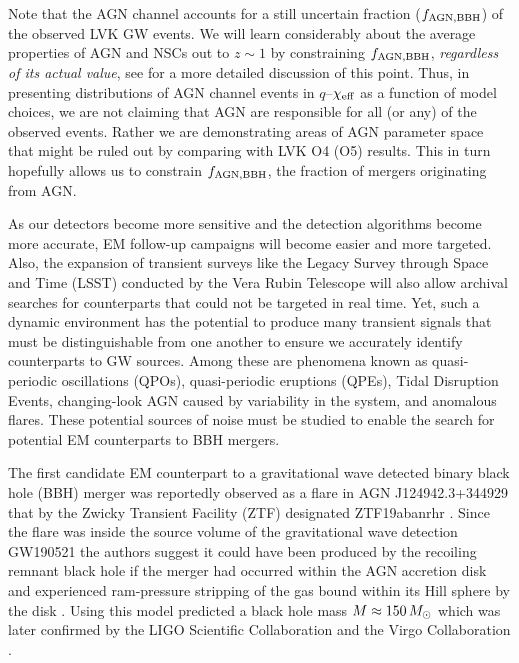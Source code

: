 Note that the AGN channel accounts for a still uncertain fraction ($f_{\rm AGN,BBH}$) of the observed LVK GW events.
We will learn considerably about the average properties of AGN and NSCs out to $z \sim 1$ by constraining $f_{\rm AGN, BBH}$, \emph{regardless of its actual value}, see \citet{FordMcKernan25} for a more detailed discussion of this point.
Thus, in presenting distributions of AGN channel events in $q$--$\chi_{\rm eff}$ as a function of model choices, we are not claiming that AGN are responsible for all (or any) of the observed events.
Rather we are demonstrating areas of AGN parameter space that might be ruled out by comparing with LVK O4 (O5) results.
This in turn hopefully allows us to constrain $f_{\rm AGN,BBH}$, the fraction of mergers originating from AGN.

As our detectors become more sensitive and the detection algorithms become more accurate, EM follow-up campaigns will become easier and more targeted.
Also, the expansion of transient surveys like the Legacy Survey through Space and Time (LSST) conducted by the Vera Rubin Telescope will also allow archival searches for counterparts that could not be targeted in real time.
Yet, such a dynamic environment has the potential to produce many transient signals that must be distinguishable from one another to ensure we accurately identify counterparts to GW sources.
Among these are phenomena known as quasi-periodic oscillations (QPOs), quasi-periodic eruptions (QPEs), Tidal Disruption Events, changing-look AGN caused by variability in the system, and anomalous flares.
These potential sources of noise must be studied to enable the search for potential EM counterparts to BBH mergers.

The first candidate EM counterpart to a gravitational wave detected binary black hole (BBH) merger was reportedly observed as a flare in AGN J124942.3+344929 that by the Zwicky Transient Facility (ZTF)  designated ZTF19abanrhr \citep[][, see ]{Graham+20}.
Since the flare was inside the source volume of the gravitational wave detection GW190521 \citep{Abbott+20-GW190521} the authors suggest it could have been produced by the recoiling remnant black hole if the merger had occurred within the AGN accretion disk and experienced ram-pressure stripping of the gas bound within its Hill sphere by the disk \citep{McKernan+19}.
Using this model \citet{Graham+20} predicted a black hole mass $M\approx150\,M_{\odot}$ which was later confirmed by the LIGO Scientific Collaboration and the Virgo Collaboration \citep{Abbott+20-GW190521}.

